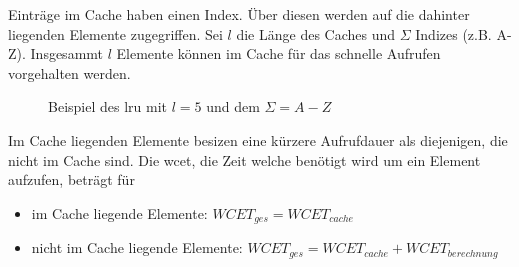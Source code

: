 Einträge im Cache haben einen Index. Über diesen werden auf die dahinter liegenden Elemente zugegriffen. Sei $l$ die Länge des Caches und $\Sigma$ Indizes (z.B. A-Z). Insgesammt $l$ Elemente können im Cache für das schnelle Aufrufen vorgehalten werden.

\begin{figure}[h]
\begin{center}
\caption[Beispiel des \ac{lru}]{Beispiel des \ac{lru} mit $l=5$ und dem $\Sigma=A-Z$}\label{cap:lrucache}
\end{center}
\end{figure}\label{fig:lrucache}


Im Cache liegenden Elemente besizen eine kürzere Aufrufdauer als diejenigen, die nicht im Cache sind. Die \ac{wcet}, die Zeit welche benötigt wird um ein Element aufzufen, beträgt für

\begin{itemize}
\item im Cache liegende Elemente: $WCET_{ges}=WCET_{cache}$
\item nicht im Cache liegende Elemente: $WCET_{ges}=WCET_{cache} + WCET_{berechnung}$
\end{itemize}

